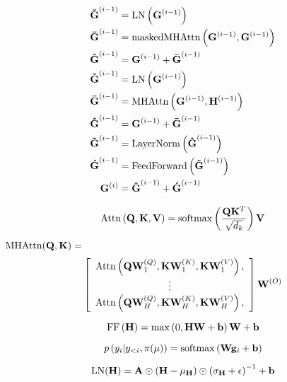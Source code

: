 \begin{align*}
    \boldsymbol{\check{\decInput}}^{(i-1)} &= \layerNorm\left(
        \decInput^{(i-1)}\right)\\
    \boldsymbol{\bar{\decInput}}^{(i-1)} &= \mmhAttn\left(
        \decInput^{(i-1)},\decInput^{(i-1)}\right)\\
    \boldsymbol{\hat{\decInput}}^{(i-1)} &= 
        \decInput^{(i-1)} + \boldsymbol{\bar{\decInput}}^{(i-1)}\\
%
    \boldsymbol{\check{\decInput}}^{(i-1)} &= \layerNorm\left(
        \decInput^{(i-1)}\right)\\
    \boldsymbol{\bar{\decInput}}^{(i-1)} &= \mhAttn\left(
        \decInput^{(i-1)},\encInput^{(i-1)}\right)\\
    \boldsymbol{\hat{\decInput}}^{(i-1)} &= 
        \decInput^{(i-1)} + \boldsymbol{\bar{\decInput}}^{(i-1)}\\
%
    \boldsymbol{\tilde{\decInput}}^{(i-1)} &= \operatorname{LayerNorm}\left(
        \boldsymbol{\hat{\decInput}}^{(i-1)} \right)\\
    \boldsymbol{\acute{\decInput}}^{(i-1)} &= \operatorname{FeedForward}\left(
        \boldsymbol{\tilde{\decInput}}^{(i-1)} \right)\\
\decInput^{(i)} & =  \boldsymbol{\hat{\decInput}}^{(i-1)} +
  \boldsymbol{\acute{\decInput}}^{(i-1)} 
\end{align*}


\[\operatorname{Attn}\left(\mathbf{Q}, \mathbf{K}, \mathbf{V}\right) = \operatorname{softmax}\left(\frac{\mathbf{Q} \mathbf{K}^T}{\sqrt{d_k}} \right)\mathbf{V} \]


\noindent  $\operatorname{MHAttn}(\mathbf{Q}, \mathbf{K}) =$
\[ \left[ \begin{array}{c} 
    \operatorname{Attn}\left(\mathbf{Q}\mathbf{W}^{(Q)}_1, \mathbf{K}\mathbf{W}^{(K)}_1, \mathbf{K} \mathbf{W}^{(V)}_1 \right),\\
    \vdots \\
    \operatorname{Attn}\left(\mathbf{Q}\mathbf{W}^{(Q)}_H, \mathbf{K}\mathbf{W}^{(K)}_H, \mathbf{K} \mathbf{W}^{(V)}_H \right),
    \end{array} \right] \mathbf{W}^{(O)}
\]


\[\operatorname{FF}\left(\mathbf{H} \right) = \max\left(0, \mathbf{H}\mathbf{W} + \mathbf{b} \right)\mathbf{W} + \mathbf{b}\]

\[ p\left(y_i|y_{<i},\pi(\mu)\right) = \operatorname{softmax}\left( \mathbf{W}\mathbf{g}_i + \mathbf{b} \right) \]



\[\operatorname{LN}(\mathbf{H}) = \mathbf{A} \odot (\mathbf{H} - \mu_{\mathbf{H}}) \odot \left(\sigma_{\mathbf{H}} + \epsilon\right)^{-1} + \mathbf{b} \]

